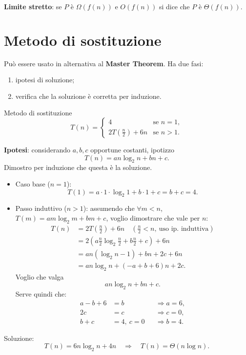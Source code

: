 \documentclass{article}
\begin{document}
\textbf{Limite stretto}: se $P$ è $\Omega(f(n))$ e $O(f(n))$ si dice che $P$ è $\Theta(f(n))$.

\section{Metodo di sostituzione}

Può essere usato in alternativa al \textbf{Master Theorem}. Ha due fasi:
\begin{enumerate}
    \item ipotesi di soluzione;
    \item verifica che la soluzione è corretta per induzione.
\end{enumerate}

\begin{ex}{Metodo di sostituzione}{}
\[
T(n)=\begin{cases}
4 & \text{se } n=1,\\
2T\left(\frac{n}{2}\right)+6n & \text{se } n>1.
\end{cases}
\]

\textbf{Ipotesi}: considerando $a,b,c$ opportune costanti, ipotizzo
\[
T(n)=an\log_2 n+bn+c.
\]
Dimostro per induzione che questa è la soluzione.
\begin{itemize}
    \item Caso base ($n=1$):
    \[
    T(1)=a\cdot1\cdot\log_2 1+b\cdot1+c=\boxed{b+c=4}.
    \]
    \item Passo induttivo ($n>1$): assumendo che $\forall m<n$, $T(m)=am\log_2 m+bm+c$, voglio dimostrare che vale per $n$:
    \begin{align*}
    T(n)&=2T\left(\frac{n}{2}\right)+6n \quad \left(\frac{n}{2}<n,\ \text{uso ip. induttiva}\right)\\
    &=2\left(a\frac{n}{2}\log_2\frac{n}{2}+b\frac{n}{2}+c\right)+6n\\
    &=an(\log_2 n-1)+bn+2c+6n\\
    &=an\log_2 n+(-a+b+6)n+2c.
    \end{align*}
    Voglio che valga
    \[
    an\log_2 n+bn+c.
    \]
    Serve quindi che:
    \begin{align*}
    a-b+6&=b & &\Rightarrow a=6,\\
    2c&=c & &\Rightarrow c=0,\\
    b+c&=4,\ c=0 & &\Rightarrow b=4.
    \end{align*}
\end{itemize}

Soluzione:
\[
\boxed{T(n)=6n\log_2 n+4n}\quad\Rightarrow\quad T(n)=\Theta(n\log n).
\]
\end{ex}
\end{document}
